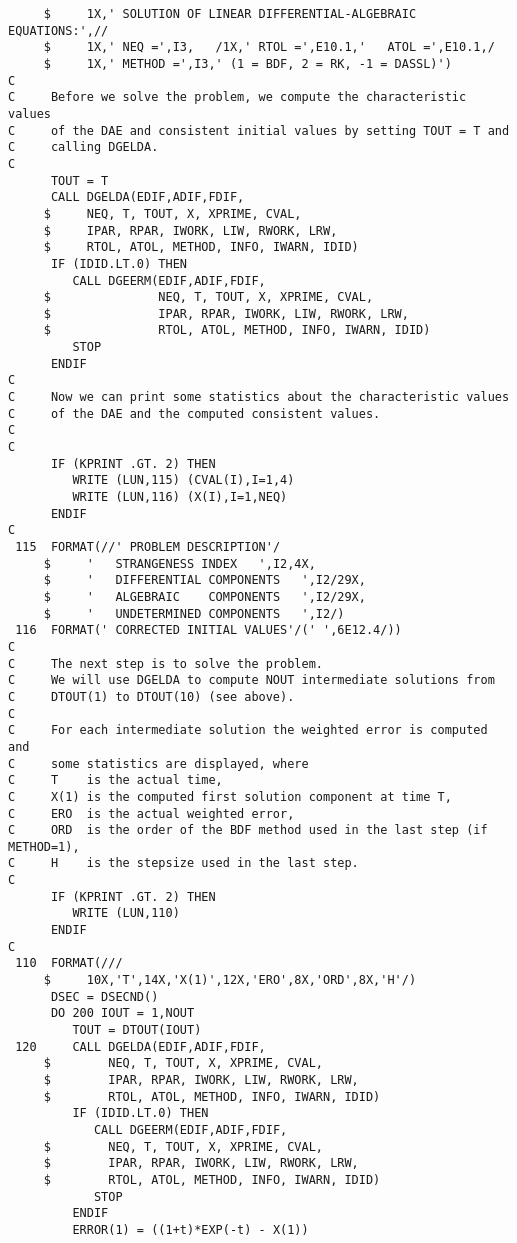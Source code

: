 \begin{verbatim}
     $     1X,' SOLUTION OF LINEAR DIFFERENTIAL-ALGEBRAIC EQUATIONS:',//
     $     1X,' NEQ =',I3,   /1X,' RTOL =',E10.1,'   ATOL =',E10.1,/
     $     1X,' METHOD =',I3,' (1 = BDF, 2 = RK, -1 = DASSL)')
C
C     Before we solve the problem, we compute the characteristic values
C     of the DAE and consistent initial values by setting TOUT = T and
C     calling DGELDA.
C
      TOUT = T
      CALL DGELDA(EDIF,ADIF,FDIF,
     $     NEQ, T, TOUT, X, XPRIME, CVAL,
     $     IPAR, RPAR, IWORK, LIW, RWORK, LRW,
     $     RTOL, ATOL, METHOD, INFO, IWARN, IDID)
      IF (IDID.LT.0) THEN
         CALL DGEERM(EDIF,ADIF,FDIF,
     $               NEQ, T, TOUT, X, XPRIME, CVAL,
     $               IPAR, RPAR, IWORK, LIW, RWORK, LRW,
     $               RTOL, ATOL, METHOD, INFO, IWARN, IDID)
         STOP
      ENDIF
C
C     Now we can print some statistics about the characteristic values
C     of the DAE and the computed consistent values.
C
C
      IF (KPRINT .GT. 2) THEN
         WRITE (LUN,115) (CVAL(I),I=1,4)
         WRITE (LUN,116) (X(I),I=1,NEQ)
      ENDIF
C
 115  FORMAT(//' PROBLEM DESCRIPTION'/
     $     '   STRANGENESS INDEX   ',I2,4X,
     $     '   DIFFERENTIAL COMPONENTS   ',I2/29X,
     $     '   ALGEBRAIC    COMPONENTS   ',I2/29X,
     $     '   UNDETERMINED COMPONENTS   ',I2/)
 116  FORMAT(' CORRECTED INITIAL VALUES'/(' ',6E12.4/))
C
C     The next step is to solve the problem.
C     We will use DGELDA to compute NOUT intermediate solutions from
C     DTOUT(1) to DTOUT(10) (see above).
C
C     For each intermediate solution the weighted error is computed and
C     some statistics are displayed, where
C     T    is the actual time,
C     X(1) is the computed first solution component at time T,
C     ERO  is the actual weighted error,
C     ORD  is the order of the BDF method used in the last step (if METHOD=1),
C     H    is the stepsize used in the last step.
C
      IF (KPRINT .GT. 2) THEN
         WRITE (LUN,110)
      ENDIF
C
 110  FORMAT(///
     $     10X,'T',14X,'X(1)',12X,'ERO',8X,'ORD',8X,'H'/)
      DSEC = DSECND()
      DO 200 IOUT = 1,NOUT
         TOUT = DTOUT(IOUT)
 120     CALL DGELDA(EDIF,ADIF,FDIF,
     $        NEQ, T, TOUT, X, XPRIME, CVAL,
     $        IPAR, RPAR, IWORK, LIW, RWORK, LRW,
     $        RTOL, ATOL, METHOD, INFO, IWARN, IDID)
         IF (IDID.LT.0) THEN
            CALL DGEERM(EDIF,ADIF,FDIF,
     $        NEQ, T, TOUT, X, XPRIME, CVAL,
     $        IPAR, RPAR, IWORK, LIW, RWORK, LRW,
     $        RTOL, ATOL, METHOD, INFO, IWARN, IDID)
            STOP
         ENDIF
         ERROR(1) = ((1+t)*EXP(-t) - X(1))

\end{verbatim}
